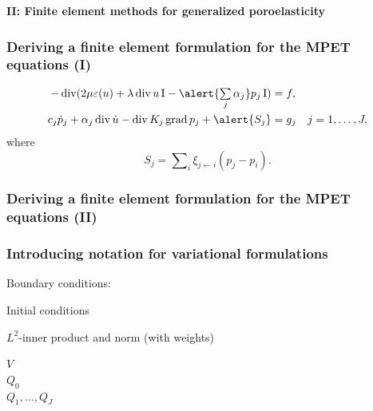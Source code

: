 \documentclass[10pt, mathserif, aspectratio=169, t]{beamer}
\DeclareMathOperator{\Div}{\mathrm{div}}
\DeclareMathOperator{\Grad}{\mathrm{grad}}
\newcommand{\foralls}{\forall \;}
\newcommand{\mysection}[1]{\begin{frame} \begin{center} \vspace{3em} \textbf{#1} \end{center} \end{frame}}
\DeclareMathOperator{\ssum}{\textstyle \sum}
\begin{document}

\mysection{II: Finite element methods for generalized poroelasticity}

\begin{frame}
  \frametitle{Deriving a finite element formulation for the MPET equations (I)}
  \begin{align*}
    - \Div (2 \mu \varepsilon(u) + \lambda \Div u \, \mathrm{I} - \alert{\ssum_{j} \alpha_j} p_j \, \mathrm{I} ) &= f, \\
    c_{j} \dot{p}_{j} + \alpha_{j} \Div \dot{u} - \Div K_{j} \Grad p_{j} + \alert{S_j} &= g_{j} \quad j = 1, \dots, J,
  \end{align*}
  where
  \begin{equation*}
    S_{j} =  \ssum_{i} \xi_{j \leftarrow i} (p_{j} - p_{i}).
  \end{equation*}
\end{frame}

\begin{frame}
  \frametitle{Deriving a finite element formulation for the MPET equations (II)}
\end{frame}

\begin{frame}
\frametitle{Introducing notation for variational formulations}

Boundary conditions:

\bigskip
\bigskip

Initial conditions

\bigskip
\bigskip

$L^2$-inner product and norm (with weights)

\bigskip
\bigskip

$V$ \\
\medskip
$Q_0$ \\
\medskip
$Q_1, \dots, Q_J$

\end{frame}
\end{document}
